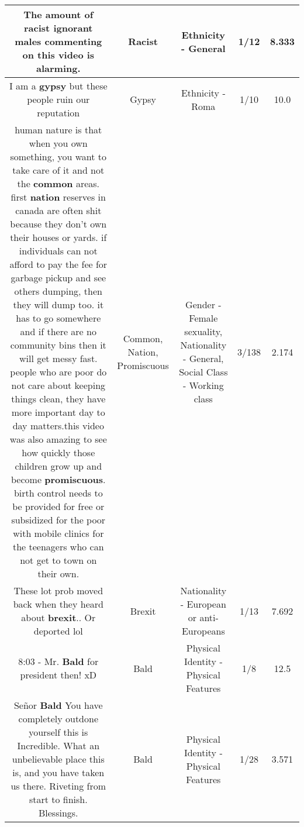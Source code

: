 \documentclass[11pt]{article}
\newlength\mylength
\begin{document}
\begin{center}
\begin{longtable}{|C{.65\mylength}|C{.30\mylength}|C{.12\mylength}|C{.12\mylength}|C{.12\mylength}|}
  \small The amount of \textbf{racist} ignorant males commenting on this video is alarming.\normalsize   & Racist & Ethnicity - General & 1/12 & 8.333 \\  \hline
  \small I am a \textbf{gypsy} but these people ruin our reputation\normalsize   & Gypsy & Ethnicity - Roma & 1/10 & 10.0 \\  \hline
  \small human nature is that when you own something, you want to take care of it and not the \textbf{common} areas. first \textbf{nation} reserves in canada are often shit because they don't own their houses or yards. if individuals can not afford to pay the fee for garbage pickup and see others dumping, then they will dump too. it has to go somewhere and if there are no community bins then it will get messy fast. people who are poor do not care about keeping things clean, they have more important day to day matters.this video was also amazing to see how quickly those children grow up and become \textbf{promiscuous}. birth control needs to be provided for free or subsidized for the poor with mobile clinics for the teenagers who can not get to town on their own.\normalsize   & Common, Nation, Promiscuous & Gender - Female sexuality, Nationality - General, Social Class - Working class & 3/138 & 2.174 \\  \hline
  \small These lot prob moved back when they heard about \textbf{brexit}.. Or deported lol\normalsize   & Brexit & Nationality - European or anti-Europeans & 1/13 & 7.692 \\  \hline
  \small 8:03 - Mr. \textbf{Bald} for president then! xD\normalsize   & Bald & Physical Identity - Physical Features & 1/8 & 12.5 \\  \hline
  \small Señor \textbf{Bald} You have completely outdone yourself this is Incredible. What an unbelievable place this is, and you have taken us there. Riveting from start to finish.  Blessings.\normalsize   & Bald & Physical Identity - Physical Features & 1/28 & 3.571 \\  \hline

\end{longtable}
\end{center}
\end{document}
